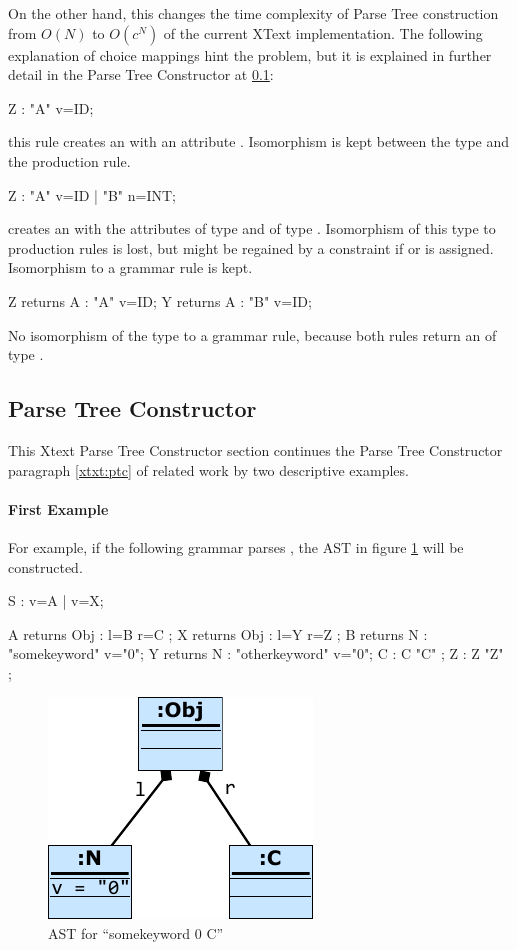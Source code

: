 On the other hand, this changes the time complexity of Parse Tree construction from $O(N)$ to $O(c^N)$ of the current XText implementation. The following explanation of choice mappings hint the problem, but it is explained in further detail in the Parse Tree Constructor at \ref{sub:Xtxt:PTC}: 
\begin{xtxt}
Z 	:  "A" v=ID;
\end{xtxt}
this rule creates an   with an  attribute . Isomorphism is kept between the type  and the production rule.
\begin{xtxt}
Z 	:  "A" v=ID  
	|  "B" n=INT;
	\end{xtxt}
creates an   with the attributes  of type  and  of type .  Isomorphism of this type to production rules is lost, but might be regained by a constraint if  or  is assigned. Isomorphism to a grammar rule is kept.
\begin{xtxt}
Z returns A : "A" v=ID;
Y returns A : "B" v=ID;
\end{xtxt}
No isomorphism of the type  to a grammar rule, because both rules return an  of type .

\subsection{Parse Tree Constructor} \label{sub:Xtxt:PTC}
This Xtext Parse Tree Constructor section continues the Parse Tree Constructor paragraph \ref{xtxt:ptc} of related work by two descriptive examples.

\paragraph{First Example}
For example, if the following grammar parses , the AST in figure \ref{AST:CSP} will be constructed.
\begin{xtxt}
S  	:  	v=A 
	| 	v=X;

A returns Obj	: 	l=B r=C   ;
X returns Obj	: 	l=Y r=Z   ;
B returns N  	:  	"somekeyword" 	v="0";
Y returns N  	: 	"otherkeyword" 	v="0";
C 		:  	 {C} "C" ;
Z 		: 	 {Z} "Z" ;
\end{xtxt}


\begin{figure}
\centering
\includegraphics[scale=1.3]{gfx/ex/CSP} 
\caption{AST for ``somekeyword 0 C''}
\label{AST:CSP}
\end{figure}


